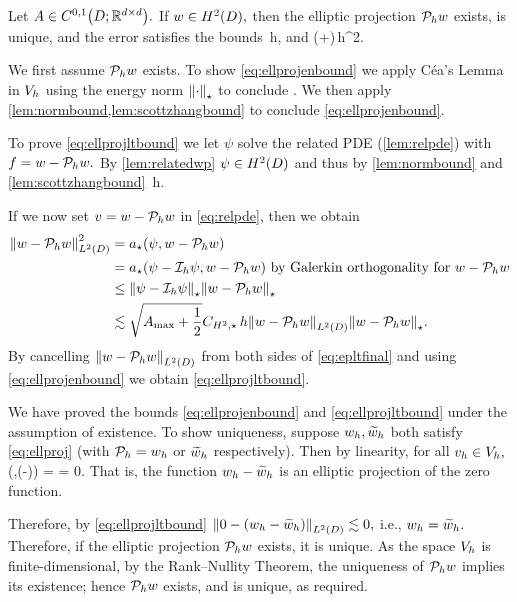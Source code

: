 \label{lem:ellprojbounds}
Let $A \in \CzoDRRdtd.$ If $w \in \HtD,$ then the elliptic projection $\mathcal P_{h} w$ exists, is unique, and the error satisfies the bounds
\beq\label{eq:ellprojenbound}
 \lesssim \sqrt{\Amax+\half}\,h,
\eeq
and
\beq\label{eq:ellprojltbound}
 \lesssim  \mleft(\Amax+\half\mright)\CHtell\,h^2.
\eeq
\ele

We first assume $\mathcal P_{h} w$ exists. To show \eqref{eq:ellprojenbound} we apply C\'{e}a's Lemma in $V_{h}$ using the energy norm $\Npi{\cdot}$ to conclude
\beqs
{} \leq {}.
\eeqs
We then apply \cref{lem:normbound,lem:scottzhangbound} to conclude \eqref{eq:ellprojenbound}.

To prove \eqref{eq:ellprojltbound} we let $\psi$ solve the related PDE (\cref{lem:relpde}) with $f = w-\mathcal P_{h} w.$ By \cref{lem:relatedwp} $\psi \in \HtD$ and thus by  \cref{lem:normbound} and \cref{lem:scottzhangbound}
\beqs
\Npi{\psi - \Ih \psi} \lesssim \sqrt{\Amax + \half}\CHtell \,h.
\eeqs

If we now set $v = w-\mathcal P_{h} w$ in \eqref{eq:relpde}, then we obtain
\begin{align}
  \NLtD{w - \Ph w}^2 &= \api\mleft(\psi,w-\Ph w\mright)\nonumber\\
                     &= \api\mleft(\psi-\Ih \psi,w-\Ph w\mright) \text{ by Galerkin orthogonality for } w-\Ph w\nonumber\\
                     &\leq \Npi{\psi-\Ih \psi}\Npi{w-\Ph w}\nonumber\\
                       &\lesssim \sqrt{\Amax + \half}\CHtell \,h\NLtD{w-\Ph w}\Npi{w-\Ph w}\label{eq:epltfinal}.
\end{align}
By cancelling $\NLtD{w- \Ph w}$ from both sides of \eqref{eq:epltfinal} and using \eqref{eq:ellprojenbound} we obtain \eqref{eq:ellprojltbound}.

We have proved the bounds \eqref{eq:ellprojenbound} and \eqref{eq:ellprojltbound} under the assumption of existence. To show uniqueness, suppose $w_{h}, \widetilde{w}_{h}$ both satisfy \eqref{eq:ellproj} (with $\mathcal P_{h} = w_{h}$ or $\widetilde{w}_{h}$ respectively). Then by linearity, for all $v_{h} \in V_{h},$
\beqs
\api\mleft(\vh,\Ph\mleft(\wh-\whtilde\mright)\mright) =  = 0.
\eeqs
That is, the function $w_{h} - \widetilde{w}_{h}$ is an elliptic projection of the zero function.

Therefore, by \eqref{eq:ellprojltbound} $\NLtD{0 - \mleft(\wh - \whtilde\mright)} \lesssim 0,$ i.e., $w_{h} = \widetilde{w}_{h}.$ Therefore, if the elliptic projection $\mathcal P_{h} w$ exists, it is unique. As the space $V_{h}$ is finite-dimensional, by the Rank--Nullity Theorem, the uniqueness of $\mathcal P_{h} w$ implies its existence; hence $\mathcal P_{h} w$ exists, and is unique, as required.
\epf


